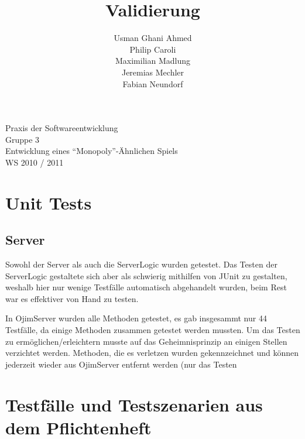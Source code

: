 \documentclass[a4paper,10pt]{article}
\title{Validierung}
\date{}
\author{Usman Ghani Ahmed \\
Philip Caroli\\
Maximilian Madlung\\ 
Jeremias Mechler\\ 
Fabian Neundorf}
\begin{document}
 
\vspace{5cm}
\maketitle
\begin{center}
\vspace{3cm}
\huge{Praxis der Softwareentwicklung \\
Gruppe 3 \\[0.5cm]
Entwicklung eines "`Monopoly"'-Ähnlichen Spiels \\[0.5cm]
WS 2010 / 2011} \\[2cm]
\end{center}

\newpage

\tableofcontents

\newpage

\section{Unit Tests}

\subsection{Server}
Sowohl der Server als auch die ServerLogic wurden getestet. Das Testen der ServerLogic gestaltete sich aber als schwierig mithilfen von JUnit zu gestalten, weshalb hier nur wenige Testfälle automatisch abgehandelt wurden, beim Rest war es effektiver von Hand zu testen.

In OjimServer wurden alle Methoden getestet, es gab insgesammt nur 44 Testfälle, da einige Methoden zusammen getestet werden mussten. Um das Testen zu ermöglichen/erleichtern musste auf das Geheimnisprinzip an einigen Stellen verzichtet werden. Methoden, die es verletzen wurden gekennzeichnet und können jederzeit wieder aus OjimServer entfernt werden (nur das Testen 

\section{Testfälle und Testszenarien aus dem Pflichtenheft}
\end{document}
